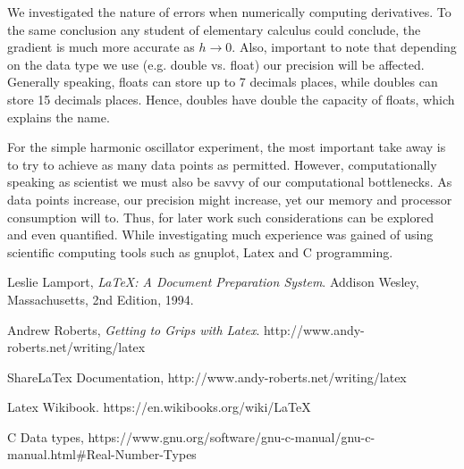\documentclass{article}
\begin{document}
We investigated the nature of errors when numerically computing derivatives. To the same conclusion
any student of elementary calculus could conclude, the gradient is much more accurate as $h \to 0$. Also, important
to note that depending on the data type we use (e.g. double vs. float) our precision will be affected. Generally speaking,
floats can store up to 7 decimals places, while doubles can store 15 decimals places. Hence, doubles have double the capacity
of floats, which explains the name.

For the simple harmonic oscillator experiment, the most important take away is to try to achieve as many data
points as permitted. However, computationally speaking as scientist we must also be savvy of our computational
bottlenecks. As data points increase, our precision might increase, yet our memory and processor consumption will
to. Thus, for later work such considerations can be explored and even quantified. While
investigating much experience was gained of using scientific computing tools such as gnuplot, Latex and C programming.

\begin{thebibliography}{9}

	  Leslie Lamport,
	  \emph{\LaTeX: A Document Preparation System}.
	  Addison Wesley, Massachusetts,
	  2nd Edition,
	  1994.

	  Andrew Roberts,
	  \emph{Getting to Grips with Latex}.
    http://www.andy-roberts.net/writing/latex

	  ShareLaTex Documentation,
    http://www.andy-roberts.net/writing/latex

	  Latex Wikibook.
    https://en.wikibooks.org/wiki/LaTeX

	  C Data types,
    https://www.gnu.org/software/gnu-c-manual/gnu-c-manual.html#Real-Number-Types

\end{thebibliography}
\end{document}
